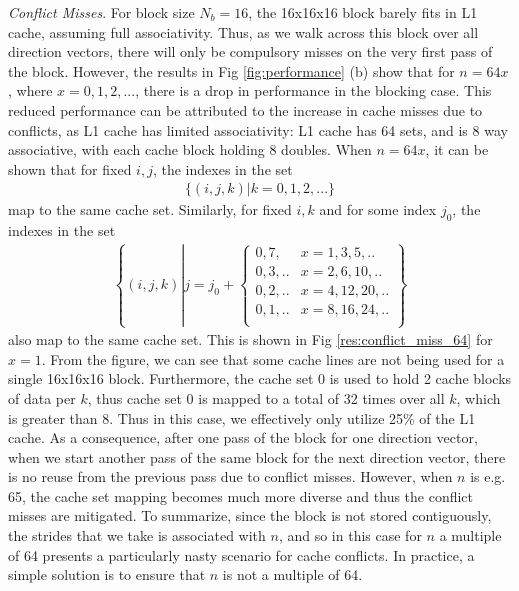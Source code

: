 \documentclass[letterpaper]{article}
\begin{document}
\textit{Conflict Misses}.
For block size $N_b = 16$, the 16x16x16 block barely fits in L1 cache, assuming full associativity. Thus, as we walk across this block over all direction vectors, there will only be compulsory misses on the very first pass of the block. However, the results in Fig \ref{fig:performance} (b) show that for $n=64x$, where $x=0,1,2,...$, there is a drop in performance in the blocking case. This reduced performance can be attributed to the increase in cache misses due to conflicts, as L1 cache has limited associativity: L1 cache has 64 sets, and is 8 way associative, with each cache block holding 8 doubles. When $n=64x$, it can be shown that for fixed $i,j$, the indexes in the set 
\begin{align*}
  \{(i,j,k) | k=0,1,2,... \}
\end{align*}
map to the same cache set. Similarly, for fixed $i,k$ and for some index $j_0$, the indexes in the set
\begin{align*}
  \left\{(i,j,k) \left| j = j_0 + \begin{cases}
                    0,7, & x=1,3,5,..\\
                    0,3,.. &x=2,6,10,..\\
                    0,2,.. &x=4,12,20,..\\
                    0,1,.. &x=8,16,24,..\\
                              \end{cases}
  \right. \right\}
\end{align*}
also map to the same cache set. This is shown in Fig \ref{res:conflict_miss_64} for $x=1$. From the figure, we can see that some cache lines are not being used for a single 16x16x16 block. Furthermore, the cache set 0 is used to hold 2 cache blocks of data per $k$, thus cache set 0 is mapped to a total of 32 times over all $k$, which is greater than 8. Thus in this case, we effectively only utilize 25\% of the L1 cache. As a consequence, after one pass of the block for one direction vector, when we start another pass of the same block for the next direction vector, there is no reuse from the previous pass due to conflict misses. However, when $n$ is e.g. 65, the cache set mapping becomes much more diverse and thus the conflict misses are mitigated. To summarize, since the block is not stored contiguously, the strides that we take is associated with $n$, and so in this case for $n$ a multiple of 64 presents a particularly nasty scenario for cache conflicts. In practice, a simple solution is to ensure that $n$ is not a multiple of 64. 
\end{document}
